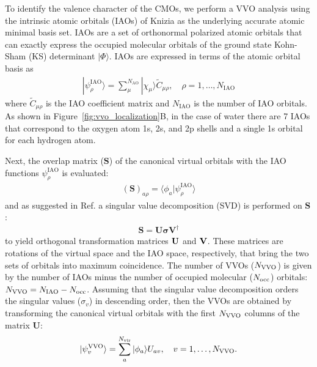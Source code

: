 \documentclass{article}
\begin{document}
To identify the valence character of the CMOs, we perform a VVO analysis\cite{Lu:2004cw,Lu:2004gq,schmidt_valence_2015} using the intrinsic atomic orbitals (IAOs) of Knizia\cite{knizia_intrinsic_2013} as the underlying accurate atomic minimal basis set.
IAOs are a set of orthonormal polarized atomic orbitals that can exactly express the occupied molecular orbitals of the ground state Kohn-Sham (KS) determinant $| \Phi \rangle$.
IAOs are expressed in terms of the atomic orbital basis as
\begin{align}
|\psi_{\rho}^\mathrm{IAO}\rangle = \sum_{\mu}^{N_\mathrm{AO}} |\chi_{\mu} \rangle \tilde{C}_{\mu \rho}, \quad \rho = 1, \ldots, N_\mathrm{IAO}
\end{align}
where $\tilde{C}_{\mu \rho}$ is the IAO coefficient matrix and $N_\mathrm{IAO}$ is the number of IAO orbitals.
As shown in Figure~\ref{fig:vvo_localization}B, in the case of water there are 7 IAOs that correspond to the oxygen atom 1s, 2s, and 2p shells and a single 1s orbital for each hydrogen atom.

Next, the overlap matrix ($\mathbf{S}$) of the canonical virtual orbitals with the IAO  functions $\psi_{\rho}^\mathrm{IAO}$ is evaluated:
\begin{align} \label{eq:overlap}
(\mathbf{S})_{a\rho} = \langle \phi_a | \psi_{\rho}^\mathrm{IAO} \rangle
\end{align}
and as suggested in Ref.  a singular value decomposition (SVD) is performed on $\mathbf{S}$:
\begin{align}
\mathbf{S} = \mathbf{U} \boldsymbol{
\sigma} \mathbf{V}^{\dagger}
\end{align}
to yield orthogonal transformation matrices ${\bf U}$ and ${\bf V}$.
These matrices are rotations of the virtual space and the IAO space, respectively, that bring the two sets of orbitals into maximum coincidence.
The number of VVOs ($N_{\rm VVO}$) is given by the number of IAOs minus the number of occupied molecular ($N_{\rm occ}$) orbitals: $N_{\rm VVO} = N_{\rm IAO} - N_{\rm occ}$.
Assuming that the singular value decomposition orders the singular values ($\sigma_v$) in descending order, then the VVOs are obtained by transforming the canonical virtual orbitals with the first $N_{\rm VVO}$ columns of the matrix $\mathbf{U}$:
\begin{equation}
\label{eq:orbital_rotation}
| \psi^{\rm VVO}_v \rangle = \sum_a^{N_\mathrm{vir}} | \phi_a \rangle U_{av}, \quad v = 1, \ldots, N_{\rm VVO}.
\end{equation}
\end{document}
